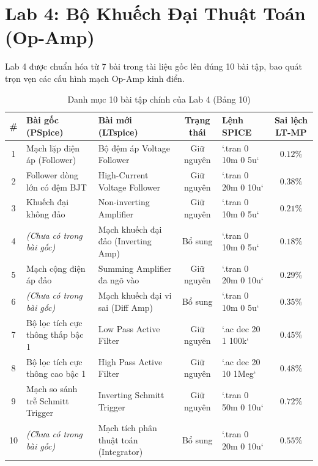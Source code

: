 \documentclass[12pt,a4paper]{report}
\begin{document}
\section{Lab 4: Bộ Khuếch Đại Thuật Toán (Op-Amp)}
Lab 4 được chuẩn hóa từ 7 bài trong tài liệu gốc lên đúng 10 bài tập, bao quát trọn vẹn các cấu hình mạch Op-Amp kinh điển.

\begin{table}[H]
\centering
\caption{Danh mục 10 bài tập chính của Lab 4 (Bảng 10)}
\label{tab:lab4_details}
\renewcommand{\arraystretch}{1.2}
\small
\begin{tabularx}{\textwidth}{|c|p{4.2cm}|p{4.0cm}|c|l|c|}
\hline
\rowcolor{codebg}
\textbf{\#} & \textbf{Bài gốc (PSpice)} & \textbf{Bài mới (LTspice)} & \textbf{Trạng thái} & \textbf{Lệnh SPICE} & \textbf{Sai lệch LT-MP} \\ \hline
1 & Mạch lặp điện áp (Follower) & Bộ đệm áp Voltage Follower & Giữ nguyên & `.tran 0 10m 0 5u` & $0.12\%$ \\ \hline
2 & Follower dòng lớn có đệm BJT & High-Current Voltage Follower & Giữ nguyên & `.tran 0 20m 0 10u` & $0.38\%$ \\ \hline
3 & Khuếch đại không đảo & Non-inverting Amplifier & Giữ nguyên & `.tran 0 10m 0 5u` & $0.21\%$ \\ \hline
4 & \textit{(Chưa có trong bài gốc)} & Mạch khuếch đại đảo (Inverting Amp) & Bổ sung & `.tran 0 10m 0 5u` & $0.18\%$ \\ \hline
5 & Mạch cộng điện áp đảo & Summing Amplifier đa ngõ vào & Giữ nguyên & `.tran 0 20m 0 10u` & $0.29\%$ \\ \hline
6 & \textit{(Chưa có trong bài gốc)} & Mạch khuếch đại vi sai (Diff Amp) & Bổ sung & `.tran 0 10m 0 5u` & $0.35\%$ \\ \hline
7 & Bộ lọc tích cực thông thấp bậc 1 & Low Pass Active Filter & Giữ nguyên & `.ac dec 20 1 100k` & $0.45\%$ \\ \hline
8 & Bộ lọc tích cực thông cao bậc 1 & High Pass Active Filter & Giữ nguyên & `.ac dec 20 10 1Meg` & $0.48\%$ \\ \hline
9 & Mạch so sánh trễ Schmitt Trigger & Inverting Schmitt Trigger & Giữ nguyên & `.tran 0 50m 0 10u` & $0.72\%$ \\ \hline
10 & \textit{(Chưa có trong bài gốc)} & Mạch tích phân thuật toán (Integrator) & Bổ sung & `.tran 0 20m 0 10u` & $0.55\%$ \\ \hline
\end{tabularx}
\end{table}
\end{document}
